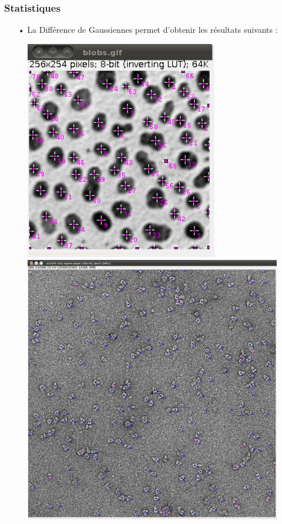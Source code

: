 \subsubsection*{Statistiques}

\begin{itemize}
\item[•] La Différence de Gaussiennes permet d'obtenir les résultats suivants :
\end{itemize}

\begin{figure}[!ht]
\begin{center}
 \begin{minipage}{.450\linewidth}
  \includegraphics[width=0.75\textwidth]{blobsDog.png}  
 \end{minipage} \hfill
\begin{minipage}{.450\linewidth}
  \includegraphics[width=1\textwidth]{protDog.png}   

\end{minipage}
\end{center}
\end{figure}
